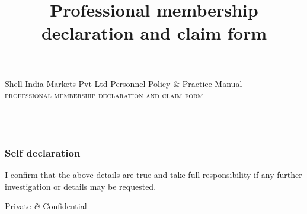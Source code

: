 \documentclass[a4paper,12pt]{article} %
\title{Professional membership declaration and claim form}
\date{}
\begin{document}
\begin{center}
	\scriptsize
	Shell India Markets Pvt Ltd \hfill Personnel Policy \& Practice Manual \\
	\vspace{18mm}
	\normalsize
	\Large\textsc{professional membership declaration and claim form}
\end{center}

  \vspace{12mm}

  \begin{Form}

  \vspace{3mm}

\noindent\begin{Form}
	 \\
	 \\
\end{Form}


  \end{Form}

\subsubsection*{Self declaration} %
\label{ssub:self_declaration}

  I confirm that the above details are true and take full responsibility if any further investigation or details may be requested.

  \vspace{3mm}

  \begin{Form}
  \end{Form}


  \vfill

  \begin{center}
  \scriptsize
    Private \emph{\&} Confidential
  \end{center}
\end{document}
